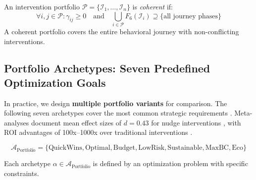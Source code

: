 \begin{proposition}
An intervention portfolio $\mathcal{P} = \{\mathcal{I}_1, \ldots, \mathcal{I}_n\}$ is \textit{coherent} if:
\begin{equation}
\forall i, j \in \mathcal{P}: \gamma_{ij} \geq 0 \quad \text{and} \quad \bigcup_{i \in \mathcal{P}} F_6(\mathcal{I}_i) \supseteq \{\text{all journey phases}\}
\end{equation}
A coherent portfolio covers the entire behavioral journey with non-conflicting interventions.
\end{proposition}


\subsection{Portfolio Archetypes: Seven Predefined Optimization Goals}
\label{sec:hhh-portfolio-archetypes}

\begin{tcolorbox}[colback=purple!5!white, colframe=purple!75!black,
    title=\textbf{Definition HHH-D6: Portfolio Archetypes}]

In practice, we design \textbf{multiple portfolio variants} for comparison. The following seven archetypes cover the most common strategic requirements \citep{hummel2019effective, szaszi2018systematic}. Meta-analyses document mean effect sizes of $d = 0.43$ for nudge interventions \citep{PAP-hummel2019effective}, with ROI advantages of 100x--1000x over traditional interventions \citep{benartzi2017should}.

\begin{equation}
\mathcal{A}_{\text{Portfolio}} = \{\text{QuickWins}, \text{Optimal}, \text{Budget}, \text{LowRisk}, \text{Sustainable}, \text{MaxBC}, \text{Eco}\}
\end{equation}

Each archetype $\alpha \in \mathcal{A}_{\text{Portfolio}}$ is defined by an optimization problem with specific constraints.
\end{tcolorbox}

